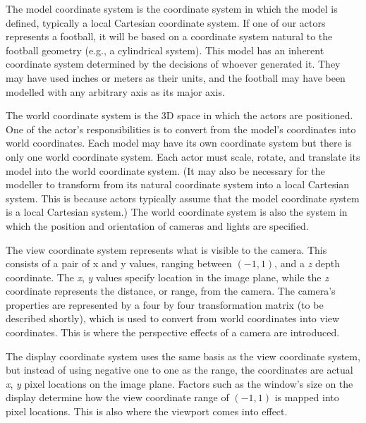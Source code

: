 The model coordinate system is the coordinate system in which the model is defined, typically a local Cartesian coordinate system. If one of our actors represents a football, it will be based on a coordinate system natural to the football geometry (e.g., a cylindrical system). This model has an inherent coordinate system determined by the decisions of whoever generated it. They may have used inches or meters as their units, and the football may have been modelled with any arbitrary axis as its major axis.

The world coordinate system is the 3D space in which the actors are positioned. One of the actor's responsibilities is to convert from the model's coordinates into world coordinates. Each model may have its own coordinate system but there is only one world coordinate system. Each actor must scale, rotate, and translate its model into the world coordinate system. (It may also be necessary for the modeller to transform from its natural coordinate system into a local Cartesian system. This is because actors typically assume that the model coordinate system is a local Cartesian system.) The world coordinate system is also the system in which the position and orientation of cameras and lights are specified.

The view coordinate system represents what is visible to the camera. This consists of a pair of x and y values, ranging between $(-1,1)$, and a \emph{z} depth coordinate. The \emph{x}, \emph{y} values specify location in the image plane, while the \emph{z} coordinate represents the distance, or range, from the camera. The camera's properties are represented by a four by four transformation matrix (to be described shortly), which is used to convert from world coordinates into view coordinates. This is where the perspective effects of a camera are introduced.

The display coordinate system uses the same basis as the view coordinate system, but instead of using negative one to one as the range, the coordinates are actual \emph{x}, \emph{y} pixel locations on the image plane. Factors such as the window's size on the display determine how the view coordinate range of $(-1,1)$ is mapped into pixel locations. This is also where the viewport comes into effect.

